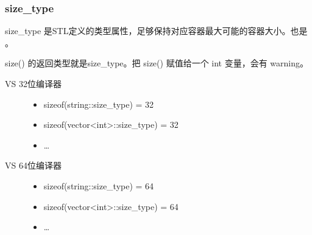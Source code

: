 \documentclass[letterpaper,10pt,english]{sphinxmanual}
\begin{document}
\subsubsection{size\_type}
\label{\detokenize{cpp/19_stl:size-type}}
size\_type 是STL定义的类型属性，足够保持对应容器最大可能的容器大小。也是  。

size() 的返回类型就是size\_type。把 size() 赋值给一个 int 变量，会有 warning。
\begin{description}
\item[{VS 32位编译器}] \leavevmode\begin{itemize}
\item {} 
sizeof(string::size\_type) = 32

\item {} 
sizeof(vector\textless{}int\textgreater{}::size\_type) = 32

\item {} 
…

\end{itemize}

\item[{VS 64位编译器}] \leavevmode\begin{itemize}
\item {} 
sizeof(string::size\_type) = 64

\item {} 
sizeof(vector\textless{}int\textgreater{}::size\_type) = 64

\item {} 
…

\end{itemize}

\end{description}
\end{document}
